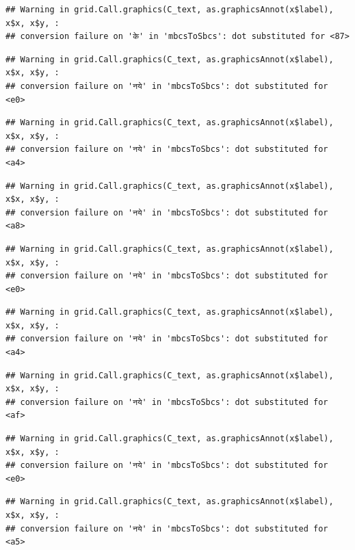 \documentclass[
]{article}
\begin{document}
\begin{verbatim}
## Warning in grid.Call.graphics(C_text, as.graphicsAnnot(x$label), x$x, x$y, :
## conversion failure on 'के' in 'mbcsToSbcs': dot substituted for <87>
\end{verbatim}

\begin{verbatim}
## Warning in grid.Call.graphics(C_text, as.graphicsAnnot(x$label), x$x, x$y, :
## conversion failure on 'नये' in 'mbcsToSbcs': dot substituted for <e0>
\end{verbatim}

\begin{verbatim}
## Warning in grid.Call.graphics(C_text, as.graphicsAnnot(x$label), x$x, x$y, :
## conversion failure on 'नये' in 'mbcsToSbcs': dot substituted for <a4>
\end{verbatim}

\begin{verbatim}
## Warning in grid.Call.graphics(C_text, as.graphicsAnnot(x$label), x$x, x$y, :
## conversion failure on 'नये' in 'mbcsToSbcs': dot substituted for <a8>
\end{verbatim}

\begin{verbatim}
## Warning in grid.Call.graphics(C_text, as.graphicsAnnot(x$label), x$x, x$y, :
## conversion failure on 'नये' in 'mbcsToSbcs': dot substituted for <e0>
\end{verbatim}

\begin{verbatim}
## Warning in grid.Call.graphics(C_text, as.graphicsAnnot(x$label), x$x, x$y, :
## conversion failure on 'नये' in 'mbcsToSbcs': dot substituted for <a4>
\end{verbatim}

\begin{verbatim}
## Warning in grid.Call.graphics(C_text, as.graphicsAnnot(x$label), x$x, x$y, :
## conversion failure on 'नये' in 'mbcsToSbcs': dot substituted for <af>
\end{verbatim}

\begin{verbatim}
## Warning in grid.Call.graphics(C_text, as.graphicsAnnot(x$label), x$x, x$y, :
## conversion failure on 'नये' in 'mbcsToSbcs': dot substituted for <e0>
\end{verbatim}

\begin{verbatim}
## Warning in grid.Call.graphics(C_text, as.graphicsAnnot(x$label), x$x, x$y, :
## conversion failure on 'नये' in 'mbcsToSbcs': dot substituted for <a5>
\end{verbatim}
\end{document}
